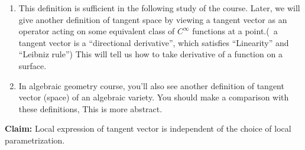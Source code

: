 \begin{remark}
    \hfill
    \begin{enumerate}[(1)]
        \item This definition is sufficient in the following study of the
              course. Later, we will give another definition of tangent space
              by viewing a tangent vector as an operator acting on some equivalent
              class of \(C^\infty\) functions at a point.(\ie\ a tangent vector
              is a ``directional derivative'', which satisfies ``Linearity'' and
              ``Leibniz rule'') This will tell us how to take derivative of a
              function on a surface.
        \item In algebraic geometry course, you'll also see another
              definition of tangent vector (space) of an algebraic variety.
              You should make a comparison with these definitions, This is
              more abstract.
    \end{enumerate}
\end{remark}
\textbf{Claim:} Local expression of tangent vector is independent of the choice of
local parametrization.
